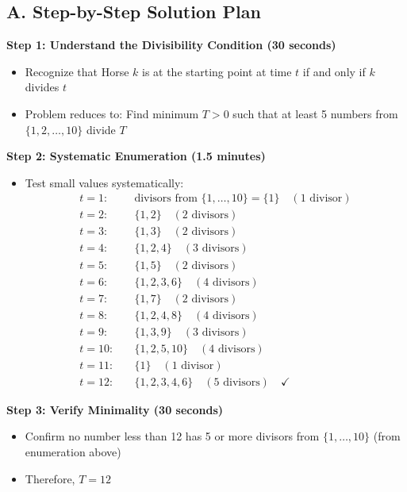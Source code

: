 \documentclass[]{article}
\begin{document}
\begin{roadmapbox}
\subsection*{A. Step-by-Step Solution Plan}

\textbf{Step 1: Understand the Divisibility Condition (30 seconds)}
\begin{itemize}[leftmargin=*]
    \item Recognize that Horse $k$ is at the starting point at time $t$ if and only if $k$ divides $t$
    \item Problem reduces to: Find minimum $T > 0$ such that at least 5 numbers from $\{1,2,\ldots,10\}$ divide $T$
\end{itemize}

\textbf{Step 2: Systematic Enumeration (1.5 minutes)}
\begin{itemize}[leftmargin=*]
    \item Test small values systematically:
    \begin{align*}
        t = 1: &\quad \text{divisors from } \{1,\ldots,10\} = \{1\} \quad (1 \text{ divisor}) \\
        t = 2: &\quad \{1, 2\} \quad (2 \text{ divisors}) \\
        t = 3: &\quad \{1, 3\} \quad (2 \text{ divisors}) \\
        t = 4: &\quad \{1, 2, 4\} \quad (3 \text{ divisors}) \\
        t = 5: &\quad \{1, 5\} \quad (2 \text{ divisors}) \\
        t = 6: &\quad \{1, 2, 3, 6\} \quad (4 \text{ divisors}) \\
        t = 7: &\quad \{1, 7\} \quad (2 \text{ divisors}) \\
        t = 8: &\quad \{1, 2, 4, 8\} \quad (4 \text{ divisors}) \\
        t = 9: &\quad \{1, 3, 9\} \quad (3 \text{ divisors}) \\
        t = 10: &\quad \{1, 2, 5, 10\} \quad (4 \text{ divisors}) \\
        t = 11: &\quad \{1\} \quad (1 \text{ divisor}) \\
        t = 12: &\quad \{1, 2, 3, 4, 6\} \quad (5 \text{ divisors}) \quad \checkmark
    \end{align*}
\end{itemize}

\textbf{Step 3: Verify Minimality (30 seconds)}
\begin{itemize}[leftmargin=*]
    \item Confirm no number less than 12 has 5 or more divisors from $\{1,\ldots,10\}$ (from enumeration above)
    \item Therefore, $T = 12$
\end{itemize}


\end{roadmapbox}
\end{document}
